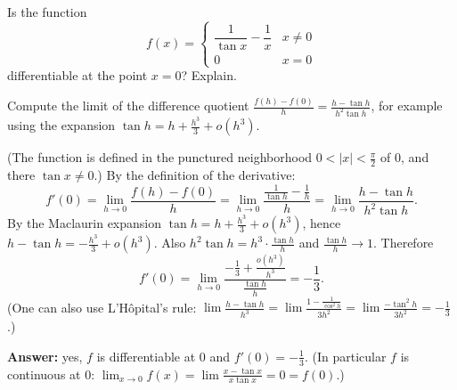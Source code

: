 
\begin{question}
Is the function
\[ f(x)=\begin{cases}\dfrac{1}{\tan x}-\dfrac1x & x\neq0\\[2mm] 0 & x=0\end{cases} \]
differentiable at the point $x=0$? Explain.
\end{question}

\begin{hint}
Compute the limit of the difference quotient $\frac{f(h)-f(0)}{h}=\frac{h-\tan h}{h^2\tan h}$, for example using the expansion $\tan h=h+\frac{h^3}{3}+o(h^3)$.
\end{hint}

\begin{solution}
(The function is defined in the punctured neighborhood $0<|x|<\frac\pi2$ of $0$, and there $\tan x\ne0$.) By the definition of the derivative:
\[ f'(0)=\lim_{h\to0}\frac{f(h)-f(0)}{h}=\lim_{h\to0}\frac{\frac1{\tan h}-\frac1h}{h}=\lim_{h\to0}\frac{h-\tan h}{h^2\tan h}. \]
By the Maclaurin expansion $\tan h=h+\frac{h^3}{3}+o(h^3)$, hence $h-\tan h=-\frac{h^3}{3}+o(h^3)$. Also $h^2\tan h=h^3\cdot\frac{\tan h}{h}$ and $\frac{\tan h}{h}\to1$. Therefore
\[ f'(0)=\lim_{h\to0}\frac{-\frac13+\frac{o(h^3)}{h^3}}{\frac{\tan h}{h}}=-\frac13. \]
(One can also use L'Hôpital's rule: $\lim\frac{h-\tan h}{h^3}=\lim\frac{1-\frac1{\cos^2h}}{3h^2}=\lim\frac{-\tan^2h}{3h^2}=-\frac13$.)

\textbf{Answer:} yes, $f$ is differentiable at $0$ and $f'(0)=-\frac13$. (In particular $f$ is continuous at $0$: $\lim_{x\to0}f(x)=\lim\frac{x-\tan x}{x\tan x}=0=f(0)$.)
\end{solution}
